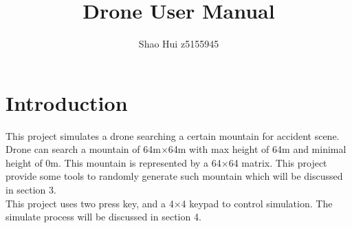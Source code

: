 \documentclass[a4paper, 12 pt]{report}
\begin{document}
\title{Drone User Manual}
\author{Shao Hui z5155945}
\date{}
\maketitle
\pagestyle{empty}
\setcounter{section}{0}
\tableofcontents
\newpage

\section{Introduction}
This project simulates a drone searching a certain mountain for accident scene.\\
Drone can search a mountain of 64m$\times$64m with max height of 64m and minimal height of 0m. This mountain is represented by a 64$\times$64 matrix. This project provide some tools to randomly generate such mountain which will be discussed in section 3.\\
This project uses two press key, and a 4$\times$4 keypad to control simulation. The simulate process will be discussed in section 4.
\newpage

\end{document}
